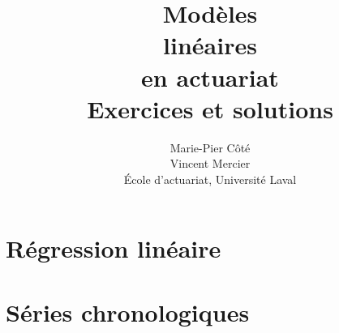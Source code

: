 \documentclass[letterpaper,10pt]{memoir}
\title{\HUGE
    \fontseries{ub}\selectfont Modèles \\
    \fontseries{ub}\selectfont linéaires\\
    \fontseries{ub}\selectfont en actuariat \\[0.5\baselineskip]
    \huge\fontseries{m}\selectfont Exercices et solutions}
\author{\LARGE Marie-Pier Côté \\[3mm]
          \LARGE Vincent Mercier \\[3mm]
    \large École d'actuariat, Université Laval}
\theoremstyle{plain}
\theoremstyle{definition}
\theoremstyle{remark}
\begin{document}

\frontmatter

\pagestyle{empty}


\pagestyle{companion}



\cleardoublepage
\tableofcontents*

\mainmatter

\part{Régression linéaire}




\part{Séries chronologiques}






\appendix





\nocite{Miller:stat:1977}



\cleardoublepage
\printindex

\cleardoublepage
\cleartoverso

\pagestyle{empty}
\renewcommand{\ttdefault}{hlst}

\bandeverso
\end{document}
